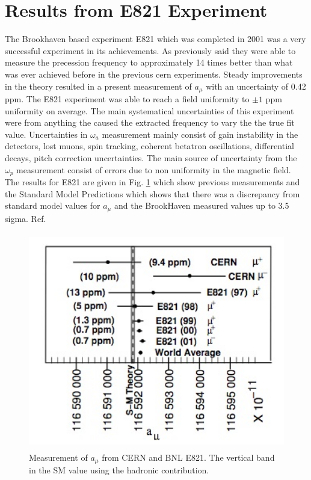 \documentclass[./Thesis]{subfiles}
\begin{document}
\section{Results from E821 Experiment}
	The Brookhaven based experiment E821 which was completed in 2001 was a very successful experiment in its achievements. As previously said they were able to measure the precession frequency to approximately 14 times better than what was ever achieved before in the previous cern experiments. Steady improvements in the theory resulted in a present measurement of $a_\mu$ with an uncertainty of 0.42 ppm. The E821 experiment was able to reach a field uniformity to $\pm1$ ppm uniformity on average. The main systematical uncertainties of this experiment were from anything the caused the extracted frequency to vary the the true fit value. Uncertainties in $\omega_a$ measurement mainly consist of gain instability in the detectors, lost muons, spin tracking, coherent betatron oscillations, differential decays, pitch correction uncertainties. The main source of uncertainty from the $\omega_p$ measurement consist of errors due to non uniformity in the magnetic field. The results for E821 are given in Fig. \ref{fig:E821Results} which show previous measurements and the Standard Model Predictions which shows that there was a discrepancy from standard model values for $a_\mu$ and the BrookHaven measured values up to 3.5 sigma. Ref.\cite{TDR}
	
\begin{figure}
\centerline{\includegraphics[height=95mm]{E821Result.jpg}}
\caption[$a_\mu$ results after E821]{ Measurement of $a_\mu$ from CERN and BNL E821. The vertical band in the SM value using the hadronic contribution. \cite{TDR}
	}
\label{fig:E821Results}
\end{figure}
\end{document}
